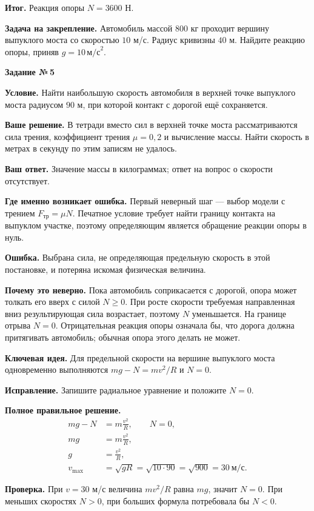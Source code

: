 \documentclass[a4paper,11pt]{article}
\newcommand{\keyidea}{\textcolor{accent}{\textbf{Ключевая идея.}}}
\newcommand{\mistake}{\textcolor{error}{\textbf{Ошибка.}}}
\newcommand{\result}{\textcolor{accent}{\textbf{Итог.}}}
\newcommand{\taskhead}[1]{\phantomsection\label{task:#1}\begin{center}{\Large\bfseries\color{ink}Задание №\,#1}\end{center}\vspace{3pt}}
\newcommand{\field}[1]{\par\vspace{2pt}\textbf{#1}\quad}
\begin{document}
\result{} Реакция опоры $N=3600$ Н.

\field{Задача на закрепление.} Автомобиль массой $800$ кг проходит вершину выпуклого моста со скоростью $10$ м/с. Радиус кривизны $40$ м. Найдите реакцию опоры, приняв $g=10\,\text{м/с}^2$.
\clearpage

\taskhead{5}
\field{Условие.} Найти наибольшую скорость автомобиля в верхней точке выпуклого моста радиусом $90$ м, при которой контакт с дорогой ещё сохраняется.

\field{Ваше решение.} В тетради вместо сил в верхней точке моста рассматриваются сила трения, коэффициент трения $\mu=0{,}2$ и вычисление массы. Найти скорость в метрах в секунду по этим записям не удалось.

\field{Ваш ответ.} Значение массы в килограммах; ответ на вопрос о скорости отсутствует.

\field{Где именно возникает ошибка.} Первый неверный шаг --- выбор модели с трением $F_{\text{тр}}=\mu N$. Печатное условие требует найти границу контакта на выпуклом участке, поэтому определяющим является обращение реакции опоры в нуль.

\mistake{} Выбрана сила, не определяющая предельную скорость в этой постановке, и потеряна искомая физическая величина.

\field{Почему это неверно.} Пока автомобиль соприкасается с дорогой, опора может толкать его вверх с силой $N\ge0$. При росте скорости требуемая направленная вниз результирующая сила возрастает, поэтому $N$ уменьшается. На границе отрыва $N=0$. Отрицательная реакция опоры означала бы, что дорога должна притягивать автомобиль; обычная опора этого делать не может.

\keyidea{} Для предельной скорости на вершине выпуклого моста одновременно выполняются $mg-N=mv^2/R$ и $N=0$.

\field{Исправление.} Запишите радиальное уравнение и положите $N=0$.

\field{Полное правильное решение.}
\begin{align*}
mg-N&=m\frac{v^2}{R},\qquad N=0,\\
mg&=m\frac{v^2}{R},\\
g&=\frac{v^2}{R},\\
v_{\max}&=\sqrt{gR}=\sqrt{10\cdot90}
=\sqrt{900}=\boxed{30\ \text{м/с}}.
\end{align*}
\field{Проверка.} При $v=30$ м/с величина $mv^2/R$ равна $mg$, значит $N=0$. При меньших скоростях $N>0$, при больших формула потребовала бы $N<0$.
\end{document}
